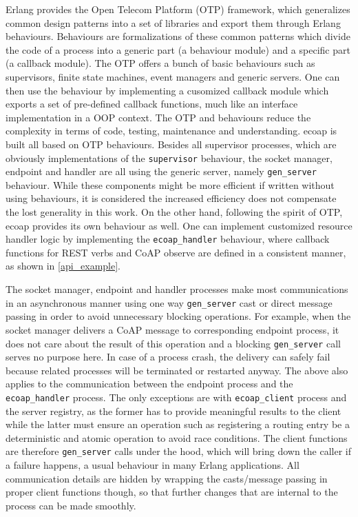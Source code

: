 Erlang provides the Open Telecom Platform (OTP) framework, which generalizes common design patterns into a set of libraries and export them through Erlang behaviours. Behaviours are formalizations of these common patterns which divide the code of a process into a generic part (a behaviour module) and a specific part (a callback module). The OTP offers a bunch of basic behaviours such as supervisors, finite state machines, event managers and generic servers. One can then use the behaviour by implementing a cusomized callback module which exports a set of pre-defined callback functions, much like an interface implementation in a OOP context. The OTP and behaviours reduce the complexity in terms of code, testing, maintenance and understanding. ecoap is built all based on OTP behaviours. Besides all supervisor processes, which are obviously implementations of the \verb|supervisor| behaviour, the socket manager, endpoint and handler are all using the generic server, namely \verb|gen_server| behaviour. While these components might be more efficient if written without using behaviours, it is considered the increased efficiency does not compensate the lost generality in this work. On the other hand, following the spirit of OTP, ecoap provides its own behaviour as well. One can implement customized resource handler logic by implementing the \verb|ecoap_handler| behaviour, where callback functions for REST verbs and CoAP observe are defined in a consistent manner, as shown in \autoref{api_example}.

The socket manager, endpoint and handler processes make most communications in an asynchronous manner using one way \verb|gen_server| cast or direct message passing in order to avoid unnecessary blocking operations. For example, when the socket manager delivers a CoAP message to corresponding endpoint process, it does not care about the result of this operation and a blocking \verb|gen_server| call serves no purpose here. In case of a process crash, the delivery can safely fail because related processes will be terminated or restarted anyway. The above also applies to the communication between the endpoint process and the \verb|ecoap_handler| process. The only exceptions are with \verb|ecoap_client| process and the server registry, as the former has to provide meaningful results to the client while the latter must ensure an operation such as registering a routing entry be a deterministic and atomic operation to avoid race conditions. The client functions are therefore \verb|gen_server| calls under the hood, which will bring down the caller if a failure happens, a usual behaviour in many Erlang applications. All communication details are hidden by wrapping the casts/message passing in proper client functions though, so that further changes that are internal to the process can be made smoothly. 

